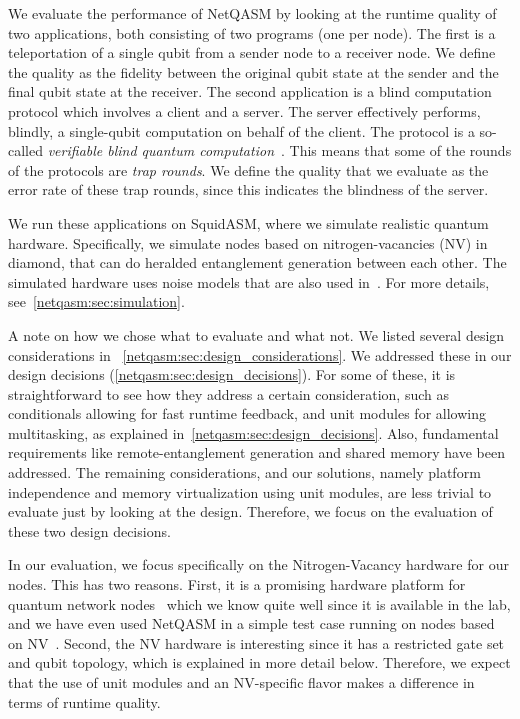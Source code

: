 We evaluate the performance of \ac{NetQASM} by looking at the runtime quality of two applications, both consisting of two programs (one per node).
The first is a teleportation of a single qubit from a sender node to a receiver node.
We define the quality as the fidelity between the original qubit state at the sender and the final qubit state at the receiver.
The second application is a blind computation protocol which involves a client and a server.
The server effectively performs, blindly, a single-qubit computation on behalf of the client.
The protocol is a so-called \textit{verifiable blind quantum computation}~\cite{fitzsimons2017unconditionally}.
This means that some of the rounds of the protocols are \textit{trap rounds}.
We define the quality that we evaluate as the error rate of these trap rounds, since this indicates the blindness of the server.

We run these applications on SquidASM, where we simulate realistic quantum hardware.
Specifically, we simulate nodes based on nitrogen-vacancies (NV) in diamond, that can do heralded entanglement generation between each other.
The simulated hardware uses noise models that are also used in~\cite{coopmans2021netsquid}.
For more details, see~\cref{netqasm:sec:simulation}.

A note on how we chose what to evaluate and what not.
We listed several design considerations in ~\cref{netqasm:sec:design_considerations}.
We addressed these in our design decisions (\cref{netqasm:sec:design_decisions}).
For some of these, it is straightforward to see how they address a certain consideration, such as conditionals allowing for fast runtime feedback, and unit modules for allowing multitasking, as explained in~\cref{netqasm:sec:design_decisions}.
Also, fundamental requirements like remote-entanglement generation and shared memory have been addressed.
The remaining considerations, and our solutions, namely platform independence and memory virtualization using unit modules, are less trivial to evaluate just by looking at the design.
Therefore, we focus on the evaluation of these two design decisions.

In our evaluation, we focus specifically on the Nitrogen-Vacancy hardware for our nodes.
This has two reasons.
First, it is a promising hardware platform for quantum network nodes~\cite{Taminiau2014} which we know quite well since it is available in the lab, and we have even used \ac{NetQASM} in a simple test case running on nodes based on NV~\cite{pompili2021experimental}.
Second, the NV hardware is interesting since it has a restricted gate set and qubit topology, which is explained in more detail below.
Therefore, we expect that the use of unit modules and an NV-specific flavor makes a difference in terms of runtime quality.

